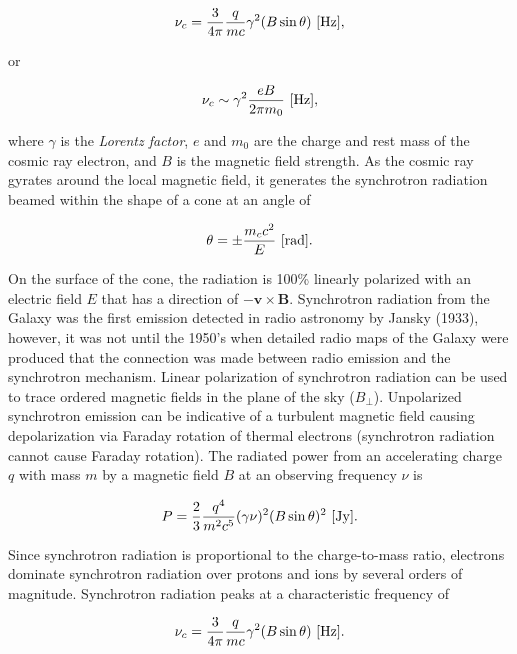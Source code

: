 \documentclass[a4paper,10pt]{article}
\begin{document}
\begin{align*}
    \nu_c = \dfrac{3}{4\pi}\dfrac{q}{mc}\gamma^2(B\sin\theta)~[{\rm Hz}],
\end{align*}

{\noindent} or

\begin{align*}
\nu_c \sim \gamma^2 \frac{eB}{2\pi m_0} ~ [{\rm Hz}],
\end{align*}

{\noindent}where $\gamma$ is the \textit{Lorentz factor}, $e$ and $m_0$ are the charge and rest mass of the cosmic ray electron, and $B$ is the magnetic field strength. As the cosmic ray gyrates around the local magnetic field, it generates the synchrotron radiation beamed within the shape of a cone at an angle of 

\begin{align*}
    \theta = \pm \frac{m_cc^2}{E} ~ [{\rm rad}].
\end{align*}

{\noindent}On the surface of the cone, the radiation is 100\% linearly polarized with an electric field $E$ that has a direction of $-\mathbf{v\times B}$. Synchrotron radiation from the Galaxy was the first emission detected in radio astronomy by Jansky (1933), however, it was not until the 1950's when detailed radio maps of the Galaxy were produced that the connection was made between radio emission and the synchrotron mechanism. Linear polarization of synchrotron radiation can be used to trace ordered magnetic fields in the plane of the sky ($B_\perp$). Unpolarized synchrotron emission can be indicative of a turbulent magnetic field causing depolarization via Faraday rotation of thermal electrons (synchrotron radiation cannot cause Faraday rotation). The radiated power from an accelerating charge $q$ with mass $m$ by a magnetic field $B$ at an observing frequency $\nu$ is

\begin{align*}
    P = \frac{2}{3}\dfrac{q^4}{m^2c^5}(\gamma\nu)^2(B\sin\theta)^2 ~ [{\rm Jy}].
\end{align*}

{\noindent}Since synchrotron radiation is proportional to the charge-to-mass ratio, electrons dominate synchrotron radiation over protons and ions by several orders of magnitude. Synchrotron radiation peaks at a characteristic frequency of

\begin{align*}
    \nu_c = \dfrac{3}{4\pi}\dfrac{q}{mc}\gamma^2(B\sin\theta)~[{\rm Hz}].
\end{align*}
\end{document}
